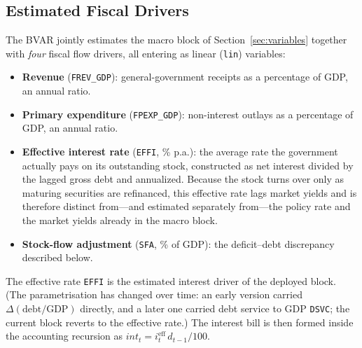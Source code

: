 \documentclass[11pt]{article}
\theoremstyle{definition}
\theoremstyle{remark}
\begin{document}
\subsection{Estimated Fiscal Drivers}\label{sec:fiscal_drivers}

The BVAR jointly estimates the macro block of
Section~\ref{sec:variables} together with \emph{four} fiscal flow drivers,
all entering as linear (\texttt{lin}) variables:
\begin{itemize}
  \item \textbf{Revenue} (\texttt{FREV\_GDP}): general-government
    receipts as a percentage of GDP, an annual ratio.
  \item \textbf{Primary expenditure} (\texttt{FPEXP\_GDP}):
    non-interest outlays as a percentage of GDP, an annual ratio.
  \item \textbf{Effective interest rate} (\texttt{EFFI}, \% p.a.): the
    average rate the government actually pays on its outstanding stock,
    constructed as net interest divided by the lagged gross debt and
    annualized. Because the stock turns over only as maturing securities are
    refinanced, this effective rate lags market yields and is therefore
    distinct from---and estimated separately from---the policy rate and the
    market yields already in the macro block.
  \item \textbf{Stock-flow adjustment} (\texttt{SFA}, \% of GDP): the
    deficit--debt discrepancy described below.
\end{itemize}
The effective rate \texttt{EFFI} is the estimated interest driver of the
deployed block. (The parametrisation has changed over time: an early version
carried $\Delta(\text{debt}/\text{GDP})$ directly, and a later one carried debt
service to GDP \texttt{DSVC}; the current block reverts to the effective rate.)
The interest bill is then formed inside the accounting recursion as
$\mathit{int}_t = i^{\text{eff}}_t\, d_{t-1}/100$.
\end{document}

